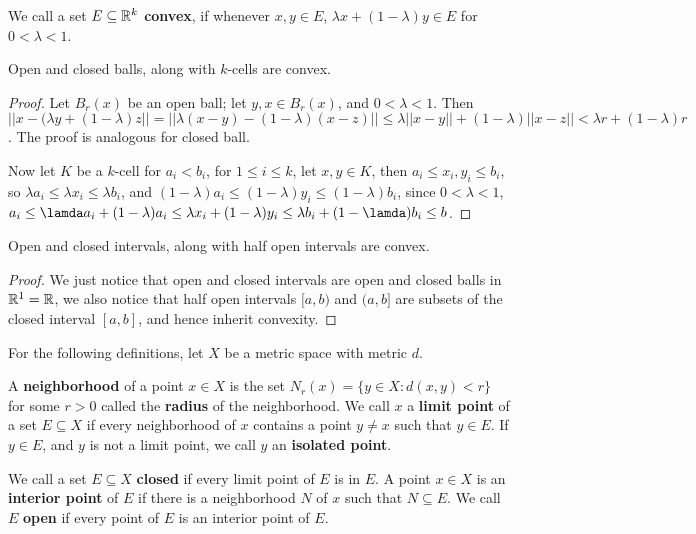 \begin{definition}
    We call a set $E \subseteq \mathbb{R}^k$ \textbf{convex}, if whenever  $x,y \in E$,
    $\lambda x+(1-\lambda)y \in E$ for  $0 <\lambda<1$.
\end{definition}

\begin{lemma}\label{2.2.1}
    Open and closed balls, along with $k$-cells are convex.
\end{lemma}
\begin{proof}
    Let $B_r(x)$ be an open ball; let $y,x \in B_r(x)$, and  $0<\lambda<1$. Then 
    $||x-(\lambda y+(1-\lambda)z||=||\lambda(x-y)-(1-\lambda)(x-z)|| \leq \lambda||x-y||+(1-\lambda)||x-z||<\lambda r+(1-\lambda)r$.
    The proof is analogous for  closed ball.

    Now let  $K$ be a  $k$-cell for  $a_i<b_i$, for  $1 \leq i \leq k$, let  $x,y \in K$, 
    then $a_i \leq x_i,y_i \leq b_i$, so  $\lambda a_i \leq \lambda x_i \leq \lambda b_i$, and $(1-\lambda)a_i \leq (1-\lambda)y_i 
    \leq (1-\lambda)b_i$, since  $0<\lambda<1$, $a_i \leq \lamda a_i+(1-\lambda)a_i \leq \lambda x_i+(1-\lambda)y_i \leq \lambda 
    b_i+(1-\lamda)b_i \leq b$.
\end{proof}

\begin{corollary}
    Open and closed intervals, along with half open intervals are convex.
\end{corollary}
\begin{proof}
    We just notice that open and closed intervals are open and closed balls in $\mathbb{R}^1=\mathbb{R}$, 
    we also notice that half open intervals $[a,b)$ and  $(a,b]$ are subsets of the closed interval 
    $[a,b]$, and hence inherit convexity.
\end{proof}

For the following definitions, let $X$ be a metric space with metric $d$.

\begin{definition}
    A  \textbf{neighborhood} of a point $x \in X$ is the set
    $N_r(x)=\{y \in X: d(x,y)<r\}$ for some $r>0$ called the \textbf{radius} of the neighborhood. 
    We call  $x$ a \textbf{limit point} of a set  $E \subseteq X$ if every neighborhood of  $x$ 
    contains a point  $y \neq x$ such that  $y \in E$. If  $y \in E$, and $y$ is not 
    a limit point, we call  $y$ an \textbf{isolated point}.
\end{definition}

\begin{definition}
    We call a set $E \subseteq X$ \textbf{closed} if every limit point of $E$ is in $E$. A point 
    $x \in X$ is an \textbf{interior point} of $E$ if there is a neighborhood $N$ of  $x$ such that 
    $N \subseteq E$. We call  $E$ \textbf{open} if every point of  $E$ is an interior point of $E$.
\end{definition}

